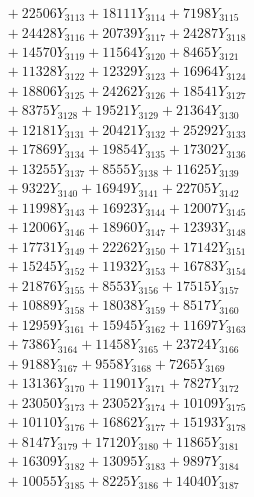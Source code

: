 \documentclass[a4paper,10pt]{article}
\begin{document}
{\begin{align}
&\;  + 22506 Y_{3113} + 18111 Y_{3114} + 7198 Y_{3115} \\[0.3ex]
&\;  + 24428 Y_{3116} + 20739 Y_{3117} + 24287 Y_{3118} \\[0.5ex]\allowbreak
&\;  + 14570 Y_{3119} + 11564 Y_{3120} + 8465 Y_{3121} \\[0.3ex]
&\;  + 11328 Y_{3122} + 12329 Y_{3123} + 16964 Y_{3124} \\[0.3ex]
&\;  + 18806 Y_{3125} + 24262 Y_{3126} + 18541 Y_{3127} \\[0.3ex]
&\;  + 8375 Y_{3128} + 19521 Y_{3129} + 21364 Y_{3130} \\[0.3ex]
&\;  + 12181 Y_{3131} + 20421 Y_{3132} + 25292 Y_{3133} \\[0.3ex]
&\;  + 17869 Y_{3134} + 19854 Y_{3135} + 17302 Y_{3136} \\[0.3ex]
&\;  + 13255 Y_{3137} + 8555 Y_{3138} + 11625 Y_{3139} \\[0.3ex]
&\;  + 9322 Y_{3140} + 16949 Y_{3141} + 22705 Y_{3142} \\[0.3ex]
&\;  + 11998 Y_{3143} + 16923 Y_{3144} + 12007 Y_{3145} \\[0.3ex]
&\;  + 12006 Y_{3146} + 18960 Y_{3147} + 12393 Y_{3148} \\[0.5ex]\allowbreak
&\;  + 17731 Y_{3149} + 22262 Y_{3150} + 17142 Y_{3151} \\[0.3ex]
&\;  + 15245 Y_{3152} + 11932 Y_{3153} + 16783 Y_{3154} \\[0.3ex]
&\;  + 21876 Y_{3155} + 8553 Y_{3156} + 17515 Y_{3157} \\[0.3ex]
&\;  + 10889 Y_{3158} + 18038 Y_{3159} + 8517 Y_{3160} \\[0.3ex]
&\;  + 12959 Y_{3161} + 15945 Y_{3162} + 11697 Y_{3163} \\[0.3ex]
&\;  + 7386 Y_{3164} + 11458 Y_{3165} + 23724 Y_{3166} \\[0.3ex]
&\;  + 9188 Y_{3167} + 9558 Y_{3168} + 7265 Y_{3169} \\[0.3ex]
&\;  + 13136 Y_{3170} + 11901 Y_{3171} + 7827 Y_{3172} \\[0.3ex]
&\;  + 23050 Y_{3173} + 23052 Y_{3174} + 10109 Y_{3175} \\[0.3ex]
&\;  + 10110 Y_{3176} + 16862 Y_{3177} + 15193 Y_{3178} \\[0.5ex]\allowbreak
&\;  + 8147 Y_{3179} + 17120 Y_{3180} + 11865 Y_{3181} \\[0.3ex]
&\;  + 16309 Y_{3182} + 13095 Y_{3183} + 9897 Y_{3184} \\[0.3ex]
&\;  + 10055 Y_{3185} + 8225 Y_{3186} + 14040 Y_{3187} \\[0.3ex]

\end{align}}
\end{document}
